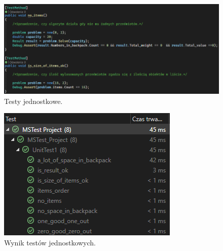 \documentclass{report}
\begin{document}
\begin{figure}[H]%
	\centering
	\includegraphics[scale=0.6]{zdj/test_third}
	\caption{Testy jednostkowe.}
\end{figure}

\begin{figure}[H]%
	\centering
	\includegraphics[scale=0.7]{zdj/test_result}
	\caption{Wynik testów jednostkowych.}
\end{figure}
\end{document}
